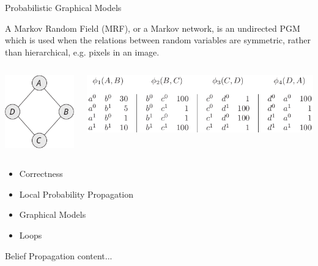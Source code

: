 \documentclass[handout]{beamer}
\begin{document}
\begin{frame}{Probabilistic Graphical Models}
    \pause
    \begin{definition}
        A Markov Random Field (MRF), or a Markov network, is an undirected PGM which is used when the relations between
        random variables are symmetric, rather than hierarchical, e.g. pixels in an image.
    \end{definition}
    \pause
    \begin{columns}
        \begin{column}[t]{0.2 \textwidth}
            \includegraphics[scale=0.4]{mrf1}
        \end{column}
        \begin{column}[t]{0.8 \textwidth}
            \includegraphics[scale=0.4]{mrf2}
        \end{column}
    \end{columns}
\end{frame}
\begin{frame}
    \begin{itemize}
        \item Correctness
        \item \alert<2>{Local Probability Propagation}
        \item \alert<1>{Graphical Models}
        \item Loops
    \end{itemize}
\end{frame}
\begin{frame}{Belief Propagation}
    content...
\end{frame}
\end{document}
